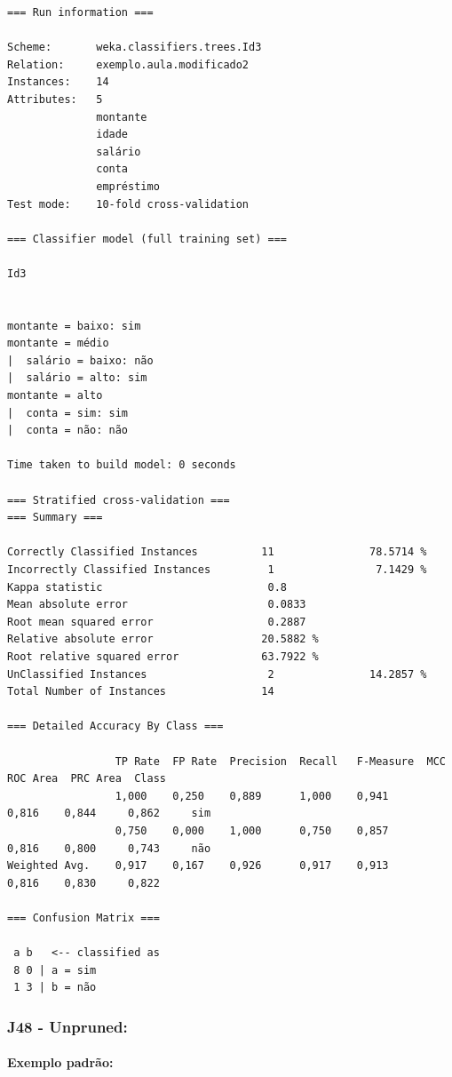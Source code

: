 \documentclass[
    article,            %
    11pt,               %
    oneside,            %
    a4paper,            %
    english,            %
    brazil,             %
    sumario=tradicional,
    ]{abntex2}
\begin{document}
\begin{Verbatim}[frame=single, fontsize=\tiny]
=== Run information ===

Scheme:       weka.classifiers.trees.Id3 
Relation:     exemplo.aula.modificado2
Instances:    14
Attributes:   5
              montante
              idade
              salário
              conta
              empréstimo
Test mode:    10-fold cross-validation

=== Classifier model (full training set) ===

Id3


montante = baixo: sim
montante = médio
|  salário = baixo: não
|  salário = alto: sim
montante = alto
|  conta = sim: sim
|  conta = não: não

Time taken to build model: 0 seconds

=== Stratified cross-validation ===
=== Summary ===

Correctly Classified Instances          11               78.5714 %
Incorrectly Classified Instances         1                7.1429 %
Kappa statistic                          0.8   
Mean absolute error                      0.0833
Root mean squared error                  0.2887
Relative absolute error                 20.5882 %
Root relative squared error             63.7922 %
UnClassified Instances                   2               14.2857 %
Total Number of Instances               14     

=== Detailed Accuracy By Class ===

                 TP Rate  FP Rate  Precision  Recall   F-Measure  MCC      ROC Area  PRC Area  Class
                 1,000    0,250    0,889      1,000    0,941      0,816    0,844     0,862     sim
                 0,750    0,000    1,000      0,750    0,857      0,816    0,800     0,743     não
Weighted Avg.    0,917    0,167    0,926      0,917    0,913      0,816    0,830     0,822     

=== Confusion Matrix ===

 a b   <-- classified as
 8 0 | a = sim
 1 3 | b = não
\end{Verbatim}


\subsubsection*{\textbf{J48 - Unpruned:}}

\paragraph*{\textbf{Exemplo padrão:}}
\end{document}
